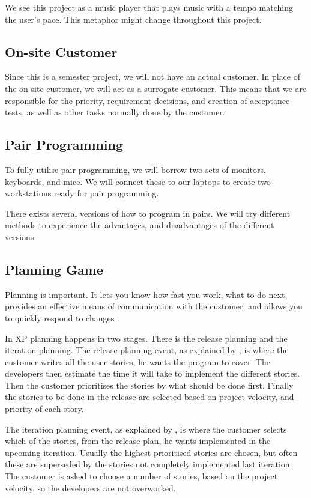 We see this project as a music player that plays music with a tempo matching the user's pace.
This metaphor might change throughout this project.

\subsection{On-site Customer}
Since this is a semester project, we will not have an actual customer.
In place of the on-site customer, we will act as a surrogate customer.
This means that we are responsible for the priority, requirement decisions, and creation of acceptance tests, as well as other tasks normally done by the customer.

\subsection{Pair Programming}
To fully utilise pair programming, we will borrow two sets of monitors, keyboards, and mice.
We will connect these to our laptops to create two workstations ready for pair programming.

There exists several versions of how to program in pairs. We will try different methods to experience the advantages, and disadvantages of the different versions.

\subsection{Planning Game}
Planning is important. It lets you know how fast you work, what to do next, provides an effective means of communication with the customer, and allows you to quickly respond to changes \citet[p. ]{xp:explored}. 

In XP planning happens in two stages. There is the release planning and the iteration planning.
The release planning event, as explained by \citet[p. ]{xp:explored}, is where the customer writes all the user stories, he wants the program to cover.
The developers then estimate the time it will take to implement the different stories.
Then the customer prioritises the stories by what should be done first.
Finally the stories to be done in the release are selected based on project velocity, and priority of each story.

The iteration planning event, as explained by \citet[p. ]{xp:explored}, is where the customer selects which of the stories, from the release plan, he wants implemented in the upcoming iteration.
Usually the highest prioritised stories are chosen, but often these are superseded by the stories not completely implemented last iteration.
The customer is asked to choose a number of stories, based on the project velocity, so the developers are not overworked.


